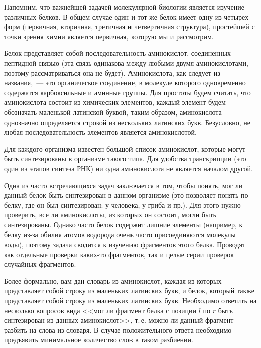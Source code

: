 Напомним, что важнейшей задачей молекулярной биологии является изучение различных белков. В общем случае один и тот же белок имеет одну из четырех форм (первичная, вторичная, третичная и четвертичная структура), простейшей с точки зрения химии является первичная, которую мы и рассмотрим.

Белок представляет собой последовательность аминокислот, соединенных пептидной связью (эта связь одинакова между любыми двумя аминокислотами, поэтому рассматриваться она не будет). Аминокислота, как следует из названия,~--- это органическое соединение, в молекуле которого одновременно содержатся карбоксильные и аминные группы. Для простоты будем считать, что аминокислота состоит из химических элементов, каждый элемент будем обозначать маленькой латинской буквой, таким образом, аминокислота однозначно определяется строкой из нескольких латинских букв. Безусловно, не любая последовательность элементов является аминокислотой.

Для каждого организма известен большой список аминокислот, которые могут быть синтезированы в организме такого типа. Для удобства транскрипции (это один из этапов синтеза РНК) ни одна аминокислота не является началом другой.

Одна из часто встречающихся задач заключается в том, чтобы понять, мог ли данный белок быть синтезирован в данном организме (это позволяет понять по белку, где он был синтезирован: у человека, у гриба и пр.). Для этого нужно проверить, все ли аминокислоты, из которых он состоит, могли быть синтезированы. Однако часто белок содержит лишние элементы (например, к белку из-за обилия атомов водорода очень часто присоединяются молекулы воды), поэтому задача сводится к изучению фрагментов этого белка. Проводят как отдельные проверки каких-то фрагментов, так и целые серии проверок случайных фрагментов.

Более формально, вам дан словарь из аминокислот, каждая из которых представляет собой строку из маленьких латинских букв, и белок, который также представляет собой строку из маленьких латинских букв. Необходимо ответить на несколько вопросов вида <<мог ли фрагмент белка с позиции $l$ по $r$ быть синтезирован из данных аминокислот>>, т.\,е. можно ли данный фрагмент разбить на слова из словаря. В случае положительного ответа необходимо предъявить минимальное количество слов в таком разбиении.

